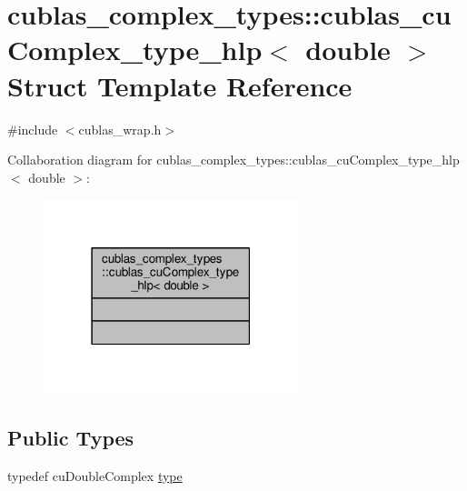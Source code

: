 \hypertarget{structcublas__complex__types_1_1cublas__cuComplex__type__hlp_3_01double_01_4}{\section{cublas\-\_\-complex\-\_\-types\-:\-:cublas\-\_\-cu\-Complex\-\_\-type\-\_\-hlp$<$ double $>$ Struct Template Reference}
\label{structcublas__complex__types_1_1cublas__cuComplex__type__hlp_3_01double_01_4}
}


{\ttfamily \#include $<$cublas\-\_\-wrap.\-h$>$}



Collaboration diagram for cublas\-\_\-complex\-\_\-types\-:\-:cublas\-\_\-cu\-Complex\-\_\-type\-\_\-hlp$<$ double $>$\-:\nopagebreak
\begin{figure}[H]
\begin{center}
\leavevmode
\includegraphics[width=210pt]{structcublas__complex__types_1_1cublas__cuComplex__type__hlp_3_01double_01_4__coll__graph}
\end{center}
\end{figure}
\subsection*{Public Types}
\begin{DoxyCompactItemize}
\item 
typedef cu\-Double\-Complex \hyperlink{structcublas__complex__types_1_1cublas__cuComplex__type__hlp_3_01double_01_4_a215753d4a8257c8998a5240596a8c2af}{type}
\end{DoxyCompactItemize}


